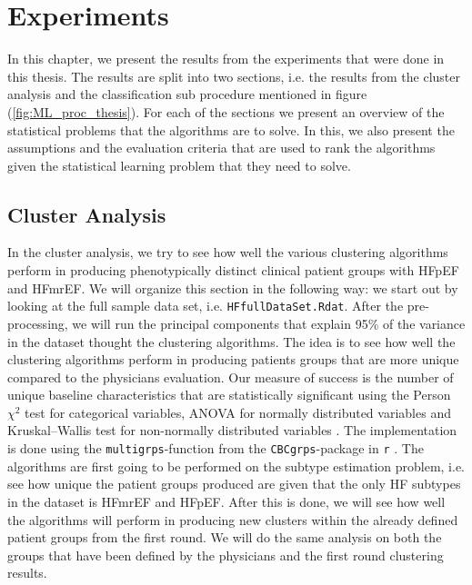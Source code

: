 \documentclass[../thesis.tex]{subfiles}
\begin{document}
\chapter{Experiments}
\label{chap:exp}

\noindent In this chapter, we present the results from the experiments that were done in this thesis. The results are split into two sections, i.e. the results from the cluster analysis and the classification sub procedure mentioned in figure (\ref{fig:ML_proc_thesis}). For each of the sections we present an overview of the statistical problems that the algorithms are to solve. In this, we also present the assumptions and the evaluation criteria that are used to rank the algorithms given the statistical learning problem that they need to solve. 

\section{Cluster Analysis}

\noindent In the cluster analysis, we try to see how well the various clustering algorithms perform in producing phenotypically distinct clinical patient groups with HFpEF and HFmrEF. We will organize this section in the following way: we start out by looking at the full sample data set, i.e. \texttt{HFfullDataSet.Rdat}.  After the pre-processing, we will run the principal components that explain 95\% of the variance in the dataset thought the clustering algorithms. The idea is to see how well the clustering algorithms perform in producing patients groups that are more unique compared to the physicians evaluation. Our measure of success is the number of unique baseline characteristics that are statistically significant using the Person $\chi^2$ test for categorical variables, ANOVA for normally distributed variables and Kruskal–Wallis test for non-normally distributed variables \citep{kruskal1952use}. The implementation is done using the \texttt{multigrps}-function from the \texttt{CBCgrps}-package in \texttt{r} \citep{CBCgrps}. The algorithms are first going to be performed on the subtype estimation problem, i.e. see how unique the patient groups produced are given that the only HF subtypes in the dataset is HFmrEF and HFpEF. After this is done, we will see how well the algorithms will perform in producing new clusters within the already defined patient groups from the first round. We will do the same analysis on both the groups that have been defined by the physicians and the first round clustering results. 
\end{document}
